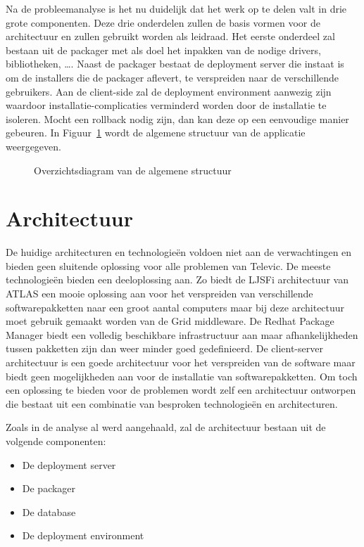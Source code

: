 
Na de probleemanalyse is het nu duidelijk dat het werk op te delen valt in drie grote componenten.
Deze drie onderdelen zullen de basis vormen voor de architectuur en zullen gebruikt worden als leidraad.
Het eerste onderdeel zal bestaan uit de packager met als doel het inpakken van de nodige drivers, bibliotheken, \ldots .
Naast de packager bestaat de deployment server die instaat is om de installers die de packager aflevert, te verspreiden naar de verschillende gebruikers.
Aan de client-side zal de deployment environment aanwezig zijn waardoor installatie-complicaties verminderd worden door de installatie te isoleren.
Mocht een rollback nodig zijn, dan kan deze op een eenvoudige manier gebeuren.
In Figuur~\ref{fig:overzichtsDiagram} wordt de algemene structuur van de applicatie weergegeven.

\begin{figure}[!hbt]
\centering
  
  \caption{Overzichtsdiagram van de algemene structuur}
  \label{fig:overzichtsDiagram}
\end{figure}

\section{Architectuur}
De huidige architecturen en technologieën voldoen niet aan de verwachtingen en bieden geen sluitende oplossing voor alle problemen van Televic.
De meeste technologieën bieden een deeloplossing aan.
Zo biedt de LJSFi architectuur van ATLAS een mooie oplossing aan voor het verspreiden van verschillende softwarepakketten naar een groot aantal computers maar bij deze architectuur moet gebruik gemaakt worden van de Grid middleware.
De Redhat Package Manager biedt een volledig beschikbare infrastructuur aan maar afhankelijkheden tussen pakketten zijn dan weer minder goed gedefinieerd.
De client-server architectuur is een goede architectuur voor het verspreiden van de software maar biedt geen mogelijkheden aan voor de installatie van softwarepakketten.
Om toch een oplossing te bieden voor de problemen wordt zelf een architectuur ontworpen die bestaat uit een combinatie van besproken technologieën en architecturen.

Zoals in de analyse al werd aangehaald, zal de architectuur bestaan uit de volgende componenten: 
\begin{itemize}
\item De deployment server
\item De packager
\item De database
\item De deployment environment
\end{itemize}

